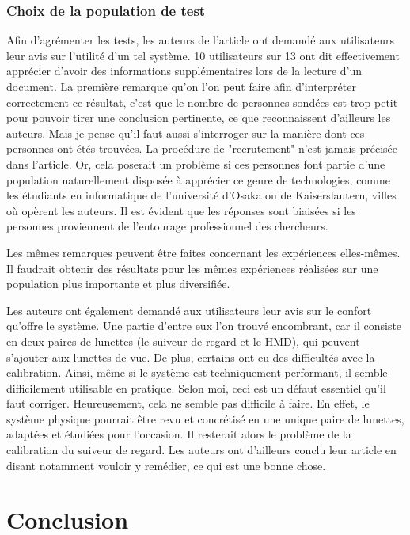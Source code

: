 \documentclass[a4paper]{article}
\begin{document}
\subsubsection{Choix de la population de test}
Afin d'agrémenter les tests, les auteurs de l'article ont demandé aux utilisateurs leur avis sur l'utilité d'un tel système. 10 utilisateurs sur 13 ont dit effectivement apprécier d'avoir des informations supplémentaires lors de la lecture d'un document. La première remarque qu'on l'on peut faire afin d'interpréter correctement ce résultat, c'est que le nombre de personnes sondées est trop petit pour pouvoir tirer une conclusion pertinente, ce que reconnaissent d'ailleurs les auteurs. Mais je pense qu'il faut aussi s'interroger sur la manière dont ces personnes ont étés trouvées. La procédure de "recrutement" n'est jamais précisée dans l'article. Or, cela poserait un problème si ces personnes font partie d'une population naturellement disposée à apprécier ce genre de technologies, comme les étudiants en informatique de l'université d'Osaka ou de Kaiserslautern, villes où opèrent les auteurs. Il est évident que les réponses sont biaisées si les personnes proviennent de l'entourage professionnel des chercheurs.

Les mêmes remarques peuvent être faites concernant les expériences elles-mêmes. Il faudrait obtenir des résultats pour les mêmes expériences réalisées sur une population plus importante et plus diversifiée.

Les auteurs ont également demandé aux utilisateurs leur avis sur le confort qu'offre le système. Une partie d'entre eux l'on trouvé encombrant, car il consiste en deux paires de lunettes (le suiveur de regard et le HMD), qui peuvent s'ajouter aux lunettes de vue. De plus, certains ont eu des difficultés avec la calibration. Ainsi, même si le système est techniquement performant, il semble difficilement utilisable en pratique. Selon moi, ceci est un défaut essentiel qu'il faut corriger. Heureusement, cela ne semble pas difficile à faire. En effet, le système physique pourrait être revu et concrétisé en une unique paire de lunettes, adaptées et étudiées pour l'occasion. Il resterait alors le problème de la calibration du suiveur de regard. Les auteurs ont d'ailleurs conclu leur article en disant notamment vouloir y remédier, ce qui est une bonne chose.


\section{Conclusion}
\end{document}
